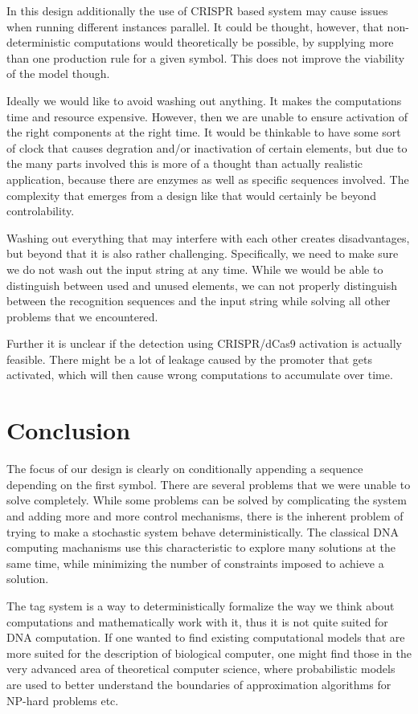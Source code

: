\documentclass[
11pt, %
a4paper, %
oneside, %
headinclude,footinclude, %
BCOR5mm, %
]{scrartcl}
\begin{document}
In this design additionally the use of CRISPR based system may cause issues when
running different instances parallel. It could be thought, however, that
non-deterministic computations would theoretically be possible, by supplying
more than one production rule for a given symbol. This does not improve the
viability of the model though.



Ideally we would like to avoid washing out anything. It makes the computations
time and resource expensive. However, then we are unable to ensure activation of
the right components at the right time. It would be thinkable to have some sort
of clock that causes degration and/or inactivation of certain elements, but due
to the many parts involved this is more of a thought than actually realistic
application, because there are enzymes as well as specific sequences involved.
The complexity that emerges from a design like that would certainly be beyond
controlability.

Washing out everything that may interfere with each other creates disadvantages,
but beyond that it is also rather challenging. Specifically, we need to make
sure we do not wash out the input string at any time. While we would be able to
distinguish between used and unused elements, we can not properly distinguish
between the recognition sequences and the input string while solving all other
problems that we encountered.

Further it is unclear if the detection using CRISPR/dCas9 activation is actually
feasible. There might be a lot of leakage caused by the promoter that gets
activated, which will then cause wrong computations to accumulate over time.

\section{Conclusion}

The focus of our design is clearly on conditionally appending a sequence
depending on the first symbol. There are several problems that we were unable to
solve completely. While some problems can be solved by complicating the system
and adding more and more control mechanisms, there is the inherent problem of
trying to make a stochastic system behave deterministically. The classical DNA
computing machanisms use this characteristic to explore many solutions at the
same time, while minimizing the number of constraints imposed to achieve a
solution.

The tag system is a way to deterministically formalize the way we think about
computations and mathematically work with it, thus it is not quite suited for
DNA computation. If one wanted to find existing computational models that are
more suited for the description of biological computer, one might find those in
the very advanced area of theoretical computer science, where probabilistic
models are used to better understand the boundaries of approximation algorithms
for NP-hard problems etc.
\end{document}
